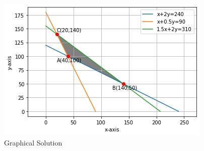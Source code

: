\documentclass[journal,12pt,twocolumn]{IEEEtran}
\begin{document}
\begin{itemize}
\begin{figure}[!ht]
\centering
\includegraphics[width=\columnwidth]{Graphical_Solution_2.30.png}
\caption{Graphical Solution}
\end{figure}

\end{itemize}
\end{document}
